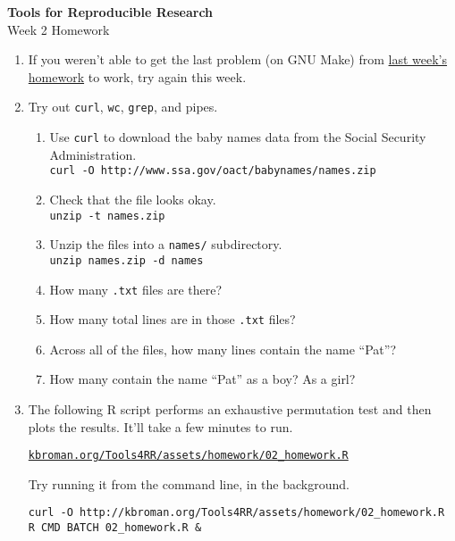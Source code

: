 \documentclass[12pt]{article}
\newcommand{\ttsm}{\tt \small}
\begin{document}
\thispagestyle{empty}

\textbf{Tools for Reproducible Research} \\
Week 2 Homework

\bigskip

\begin{enumerate}

\item If you weren't able to get the last problem (on GNU Make) from
  \href{http://kbroman.org/Tools4RR/assets/homework/01_homework.pdf}{last week's homework}
  to work, try again this week.

\item Try out {\ttsm curl}, {\ttsm wc}, {\ttsm grep}, and pipes.

  \begin{enumerate}
  \item Use {\ttsm curl} to download the baby names data from the
    Social Security Administration. \\
    {\ttsm curl -O http://www.ssa.gov/oact/babynames/names.zip}

  \item Check that the file looks okay.\\
    {\ttsm unzip -t names.zip}

  \item Unzip the files into a {\ttsm names/} subdirectory.\\
    {\ttsm unzip names.zip -d names}

  \item How many {\ttsm .txt} files are there?

  \item How many total lines are in those {\ttsm .txt} files?

  \item Across all of the files, how many lines contain the name
    ``Pat''?

  \item How many contain the name ``Pat'' as a boy? As a girl?
  \end{enumerate}


\item The following R script performs an exhaustive permutation test and
  then plots the results. It'll take a few minutes to run.

  \href{http://kbroman.org/Tools4RR/assets/homework/02_homework.R}{\ttsm kbroman.org/Tools4RR/assets/homework/02\_homework.R}

  Try running it from the command line, in the background.

  {\ttsm curl -O http://kbroman.org/Tools4RR/assets/homework/02\_homework.R} \\
  {\ttsm R CMD BATCH 02\_homework.R \&}

\end{enumerate}
\end{document}
